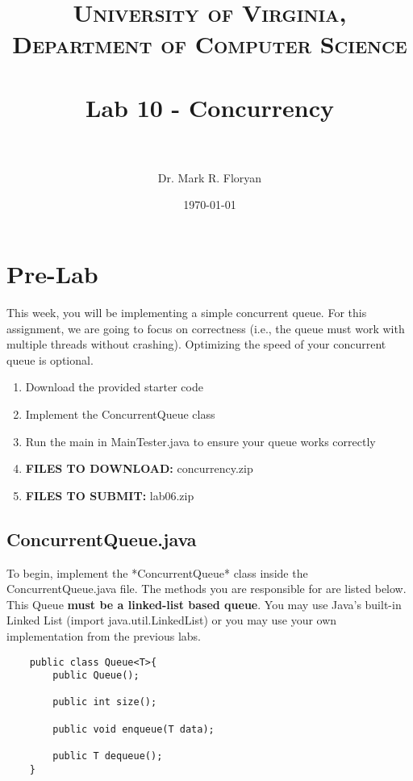 \documentclass[paper=a4, fontsize=11pt, parskip=full]{scrartcl} %
\title{
\normalfont \normalsize
\textsc{University of Virginia, Department of Computer Science} \\ [25pt] %
\horrule{0.5pt} \\[0.4cm] %
\huge Lab 10 - Concurrency \\ %
\horrule{2pt} \\[0.5cm] %
}
\author{Dr. Mark R. Floryan} %
\date{\normalsize\today} %
\numberwithin{equation}{section} %
\numberwithin{figure}{section} %
\numberwithin{table}{section} %
\begin{document}
\maketitle %


\section{Pre-Lab}

This week, you will be implementing a simple concurrent queue. For this assignment, we are going to focus on correctness (i.e., the queue must work with multiple threads without crashing). Optimizing the speed of your concurrent queue is optional.

\begin{enumerate}
	\item Download the provided starter code
	\item Implement the ConcurrentQueue class
	\item Run the main in MainTester.java to ensure your queue works correctly
	\item \textbf{FILES TO DOWNLOAD:} concurrency.zip
	\item \textbf{FILES TO SUBMIT:} lab06.zip
\end{enumerate}


\subsection{ConcurrentQueue.java}

To begin, implement the *ConcurrentQueue* class inside the ConcurrentQueue.java file. The methods you are responsible for are listed below. This Queue \textbf{must be a linked-list based queue}. You may use Java's built-in Linked List (import java.util.LinkedList) or you may use your own implementation from the previous labs.

\begin{lstlisting}
	public class Queue<T>{
		public Queue();

		public int size();

		public void enqueue(T data);

		public T dequeue();
	}
\end{lstlisting}
\end{document}
